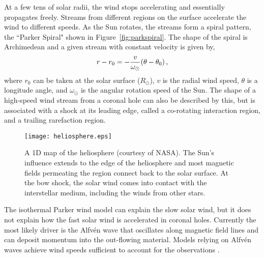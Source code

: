 
At a few tens of solar radii, the wind stops accelerating and essentially propagates freely. Streams from different regions on the surface accelerate the wind to different speeds. As the Sun rotates, the streams form a spiral pattern, the ``Parker Spiral" shown in Figure~\ref{fig:parkspiral}. The shape of the spiral is Archimedean and a given stream with constant velocity is given by,
\begin{equation}
r-r_0 =  - \frac{v}{\omega_{\odot}}(\theta-\theta_0) \mbox{\,,}
\end{equation}
where $r_0$ can be taken at the solar surface ($R_\odot$), $v$ is the radial wind speed, $\theta$ is a longitude angle, and $\omega_{\odot}$ is the angular rotation speed of the Sun. The shape of a high-speed wind stream from a coronal hole can also be described by this, but is associated with a shock at its leading edge, called a co-rotating interaction region, and a trailing rarefaction region.

\begin{figure}[!t]
\centerline{\texttt{[image: heliosphere.eps]}}
\caption[A 1D map of the heliosphere.]{A 1D map of the heliosphere (courtesy of NASA). The Sun's influence extends to the edge of the heliosphere and most magnetic fields permeating the region connect back to the solar surface. At the bow shock, the solar wind comes into contact with the interstellar medium, including the winds from other stars.}
\label{fig:heliosphere}
\end{figure}

The isothermal Parker wind model can explain the slow solar wind, but it does not explain how the fast solar wind is accelerated in coronal holes. Currently the most likely driver is the Alfv\'en wave that oscillates along magnetic field lines and can deposit momentum into the out-flowing material. Models relying on Alfv\'en waves achieve wind speeds sufficient to account for the observations \citep{Ofman:2010}. 


